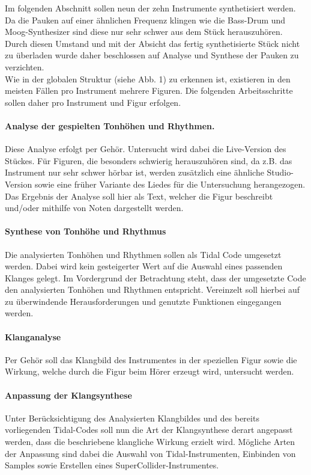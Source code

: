 \documentclass[
10pt, %
a4paper, %
oneside, %
headinclude,footinclude, %
BCOR5mm, %
]{scrartcl}
\begin{document}
\noindent Im folgenden Abschnitt sollen neun der zehn Instrumente synthetisiert werden. Da die Pauken auf einer ähnlichen Frequenz klingen wie die Bass-Drum und Moog-Synthesizer sind diese nur sehr schwer aus dem Stück herauszuhören. Durch diesen Umstand und mit der Absicht das fertig synthetisierte Stück nicht zu überladen wurde daher beschlossen auf Analyse und Synthese der Pauken zu verzichten.\\

\noindent Wie in der globalen Struktur (siehe Abb. 1) zu erkennen ist, existieren in den meisten Fällen pro Instrument mehrere Figuren. Die folgenden Arbeitsschritte sollen daher pro Instrument und Figur erfolgen.

\paragraph{Analyse der gespielten Tonhöhen und Rhythmen.}  Diese Analyse erfolgt per Gehör. Untersucht wird dabei die Live-Version\cite{YT1} des Stückes. Für Figuren, die besonders schwierig herauszuhören sind, da z.B. das Instrument nur sehr schwer hörbar ist, werden zusätzlich eine ähnliche Studio-Version\cite{YT2} sowie eine früher Variante\cite{YT3} des Liedes für die Untersuchung herangezogen.	Das Ergebnis der Analyse soll hier als Text, welcher die Figur beschreibt und/oder mithilfe von Noten dargestellt werden. 

\paragraph{Synthese von Tonhöhe und Rhythmus} Die analysierten Tonhöhen und Rhythmen sollen als Tidal Code umgesetzt werden. Dabei wird kein gesteigerter Wert auf die Auswahl eines passenden Klanges gelegt. Im Vordergrund der Betrachtung steht, dass der umgesetzte Code den analysierten Tonhöhen und Rhythmen entspricht. Vereinzelt soll hierbei auf zu überwindende Herausforderungen und genutzte Funktionen eingegangen werden.

\paragraph{Klanganalyse} Per Gehör soll das Klangbild des Instrumentes in der speziellen Figur sowie die Wirkung, welche durch die Figur beim Hörer erzeugt wird, untersucht werden. 

\paragraph{Anpassung der Klangsynthese} Unter Berücksichtigung des Analysierten Klangbildes und des bereits vorliegenden Tidal-Codes soll nun die Art der Klangsynthese derart angepasst werden, dass die beschriebene klangliche Wirkung erzielt wird. Mögliche Arten der Anpassung sind dabei die Auswahl von Tidal-Instrumenten, Einbinden von Samples sowie Erstellen eines SuperCollider-Instrumentes.\\
\end{document}
